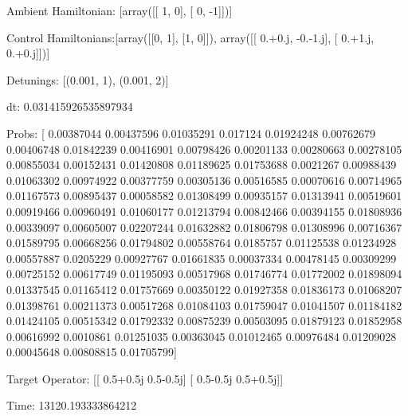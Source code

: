\documentclass{article}
\begin{document}
    

\newpage

Ambient Hamiltonian: [array([[ 1,  0],
       [ 0, -1]])]

Control Hamiltonians:[array([[0, 1],
       [1, 0]]), array([[ 0.+0.j, -0.-1.j],
       [ 0.+1.j,  0.+0.j]])]

Detunings: [(0.001, 1), (0.001, 2)]

 dt: 0.031415926535897934

Probs: [ 0.00387044  0.00437596  0.01035291  0.017124    0.01924248  0.00762679
  0.00406748  0.01842239  0.00416901  0.00798426  0.00201133  0.00280663
  0.00278105  0.00855034  0.00152431  0.01420808  0.01189625  0.01753688
  0.0021267   0.00988439  0.01063302  0.00974922  0.00377759  0.00305136
  0.00516585  0.00070616  0.00714965  0.01167573  0.00895437  0.00058582
  0.01308499  0.00935157  0.01313941  0.00519601  0.00919466  0.00960491
  0.01060177  0.01213794  0.00842466  0.00394155  0.01808936  0.00339097
  0.00605007  0.02207244  0.01632882  0.01806798  0.01308996  0.00716367
  0.01589795  0.00668256  0.01794802  0.00558764  0.0185757   0.01125538
  0.01234928  0.00557887  0.0205229   0.00927767  0.01661835  0.00037334
  0.00478145  0.00309299  0.00725152  0.00617749  0.01195093  0.00517968
  0.01746774  0.01772002  0.01898094  0.01337545  0.01165412  0.01757669
  0.00350122  0.01927358  0.01836173  0.01068207  0.01398761  0.00211373
  0.00517268  0.01084103  0.01759047  0.01041507  0.01184182  0.01424105
  0.00515342  0.01792332  0.00875239  0.00503095  0.01879123  0.01852958
  0.00616992  0.0010861   0.01251035  0.00363045  0.01012465  0.00976484
  0.01209028  0.00045648  0.00808815  0.01705799]

Target Operator: [[ 0.5+0.5j  0.5-0.5j]
 [ 0.5-0.5j  0.5+0.5j]]

Time: 13120.193333864212
\end{document}
